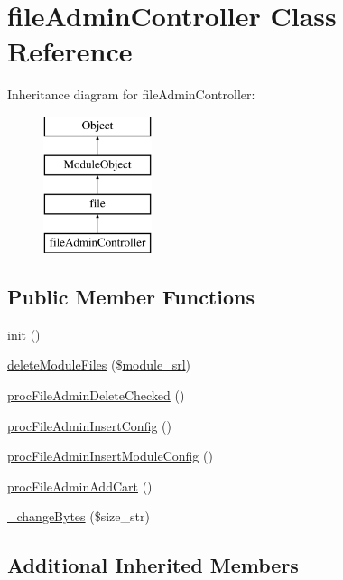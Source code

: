 \hypertarget{classfileAdminController}{}\section{file\+Admin\+Controller Class Reference}
\label{classfileAdminController}
Inheritance diagram for file\+Admin\+Controller\+:\begin{figure}[H]
\begin{center}
\leavevmode
\includegraphics[height=4.000000cm]{classfileAdminController}
\end{center}
\end{figure}
\subsection*{Public Member Functions}
\begin{DoxyCompactItemize}
\item 
\hyperlink{classfileAdminController_a7926db5aa01c3f22d73c746dfc10c318}{init} ()
\item 
\hyperlink{classfileAdminController_aaa637d3e043a4be10292fa2514c4f0f3}{delete\+Module\+Files} (\$\hyperlink{ko_8install_8php_a370bb6450fab1da3e0ed9f484a38b761}{module\+\_\+srl})
\item 
\hyperlink{classfileAdminController_a0f3042e741a71e3223ea0c9af2d224a4}{proc\+File\+Admin\+Delete\+Checked} ()
\item 
\hyperlink{classfileAdminController_a03889846de03ed7142320ef12aed5eda}{proc\+File\+Admin\+Insert\+Config} ()
\item 
\hyperlink{classfileAdminController_af0fc824e9379d6c2fdd55c7b7444c317}{proc\+File\+Admin\+Insert\+Module\+Config} ()
\item 
\hyperlink{classfileAdminController_a9ba55f911e0f616159687149b0b37fc3}{proc\+File\+Admin\+Add\+Cart} ()
\item 
\hyperlink{classfileAdminController_a2b92b91c0bda79fc26a56f67bae97ede}{\+\_\+change\+Bytes} (\$size\+\_\+str)
\end{DoxyCompactItemize}
\subsection*{Additional Inherited Members}


